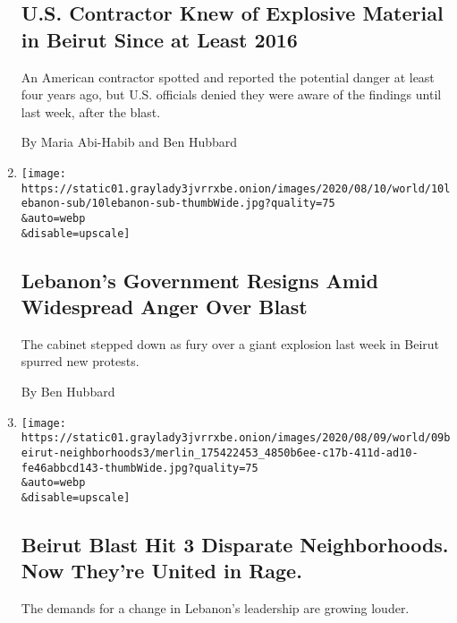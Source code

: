 \begin{enumerate}
  \hypertarget{us-contractor-knew-of-explosive-material-in-beirut-since-at-least-2016}{%
  \subsection{U.S. Contractor Knew of Explosive Material in Beirut Since
  at Least
  2016}\label{us-contractor-knew-of-explosive-material-in-beirut-since-at-least-2016}}

  An American contractor spotted and reported the potential danger at
  least four years ago, but U.S. officials denied they were aware of the
  findings until last week, after the blast.

  By Maria Abi-Habib and Ben Hubbard
\item
  \href{/2020/08/10/world/middleeast/lebanon-government-resigns-beirut.html}{}

  \texttt{[image: https://static01.graylady3jvrrxbe.onion/images/2020/08/10/world/10lebanon-sub/10lebanon-sub-thumbWide.jpg?quality=75\\\&auto=webp\\\&disable=upscale]}

  \hypertarget{lebanons-government-resigns-amid-widespread-anger-over-blast}{%
  \subsection{Lebanon's Government Resigns Amid Widespread Anger Over
  Blast}\label{lebanons-government-resigns-amid-widespread-anger-over-blast}}

  The cabinet stepped down as fury over a giant explosion last week in
  Beirut spurred new protests.

  By Ben Hubbard
\item
  \href{/2020/08/09/world/middleeast/beirut-explosion-victims-neighborhoods.html}{}

  \texttt{[image: https://static01.graylady3jvrrxbe.onion/images/2020/08/09/world/09beirut-neighborhoods3/merlin\_175422453\_4850b6ee-c17b-411d-ad10-fe46abbcd143-thumbWide.jpg?quality=75\\\&auto=webp\\\&disable=upscale]}

  \hypertarget{beirut-blast-hit-3-disparate-neighborhoods-now-theyre-united-in-rage}{%
  \subsection{Beirut Blast Hit 3 Disparate Neighborhoods. Now They're
  United in
  Rage.}\label{beirut-blast-hit-3-disparate-neighborhoods-now-theyre-united-in-rage}}

  The demands for a change in Lebanon's leadership are growing louder.


\end{enumerate}
